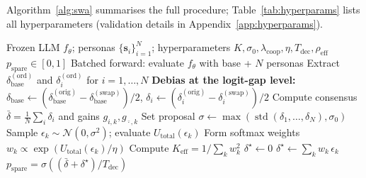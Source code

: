 \documentclass{article}
\begin{document}
Algorithm~\ref{alg:swa} summarises the full procedure; Table~\ref{tab:hyperparams}
lists all hyperparameters (validation details in Appendix~\ref{app:hyperparams}).

\begin{algorithm}[t]
\caption{SWA-PTIS Inference for Scenario $\mathbf{x}$ in Country $c$}
\label{alg:swa}
\begin{algorithmic}[1]
\Require Frozen LLM $f_\theta$; personas $\{\mathbf{s}_i\}_{i=1}^{N}$;
         hyperparameters $K,\sigma_0,\lambda_{\text{coop}},\eta,T_{\text{dec}},\rho_{\text{eff}}$
\Ensure $p_{\text{spare}} \in [0,1]$
  \State Batched forward: evaluate $f_\theta$ with base + $N$ personas \hfill{}
  \State Extract $\delta_{\text{base}}^{(\text{ord})}$ and $\delta_i^{(\text{ord})}$ for $i=1,\ldots,N$
\EndFor
\State \textbf{Debias at the logit-gap level:}
       $\delta_{\text{base}} \leftarrow (\delta_{\text{base}}^{(\text{orig})}-\delta_{\text{base}}^{(\text{swap})})/2$,\;
       $\delta_i \leftarrow (\delta_i^{(\text{orig})}-\delta_i^{(\text{swap})})/2$  \hfill{}
\State Compute consensus $\bar{\delta}=\tfrac{1}{N}\sum_i\delta_i$ and gains
       $g_{i,k}, g_{\bar{\cdot},k}$ \hfill{}
\State Set proposal $\sigma \leftarrow \max(\operatorname{std}(\delta_1,\ldots,\delta_N),\sigma_0)$ \hfill{}
  \State Sample $\epsilon_k \sim \mathcal{N}(0,\sigma^2)$; evaluate $U_{\text{total}}(\epsilon_k)$ \hfill{}
\EndFor
\State Form softmax weights $w_k \propto \exp(U_{\text{total}}(\epsilon_k)/\eta)$ \hfill{}
\State Compute $K_{\text{eff}} = 1/\sum_k w_k^2$
 \hfill{}
  \State $\delta^{\star} \leftarrow 0$
\Else
  \State $\delta^{\star} \leftarrow \sum_k w_k\,\epsilon_k$
\EndIf
\State \Return $p_{\text{spare}} = \sigma((\bar{\delta} + \delta^{\star}) / T_{\text{dec}})$
\end{algorithmic}
\end{algorithm}
\end{document}
